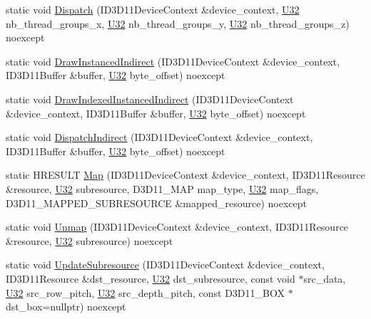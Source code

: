 \begin{DoxyCompactItemize}
\item 
static void \mbox{\hyperlink{structmage_1_1rendering_1_1_pipeline_a96bbf2861a3d4c10ba87c6b6f5228595}{Dispatch}} (I\+D3\+D11\+Device\+Context \&device\+\_\+context, \mbox{\hyperlink{namespacemage_aa5d6eaabaac3cdd01873d6a3d27e90f3}{U32}} nb\+\_\+thread\+\_\+groups\+\_\+x, \mbox{\hyperlink{namespacemage_aa5d6eaabaac3cdd01873d6a3d27e90f3}{U32}} nb\+\_\+thread\+\_\+groups\+\_\+y, \mbox{\hyperlink{namespacemage_aa5d6eaabaac3cdd01873d6a3d27e90f3}{U32}} nb\+\_\+thread\+\_\+groups\+\_\+z) noexcept
\item 
static void \mbox{\hyperlink{structmage_1_1rendering_1_1_pipeline_acfdf1d2aba1e8c0db9c4ef9e9730f31c}{Draw\+Instanced\+Indirect}} (I\+D3\+D11\+Device\+Context \&device\+\_\+context, I\+D3\+D11\+Buffer \&buffer, \mbox{\hyperlink{namespacemage_aa5d6eaabaac3cdd01873d6a3d27e90f3}{U32}} byte\+\_\+offset) noexcept
\item 
static void \mbox{\hyperlink{structmage_1_1rendering_1_1_pipeline_a51e2744827cbcf7791fcb40c0131d11b}{Draw\+Indexed\+Instanced\+Indirect}} (I\+D3\+D11\+Device\+Context \&device\+\_\+context, I\+D3\+D11\+Buffer \&buffer, \mbox{\hyperlink{namespacemage_aa5d6eaabaac3cdd01873d6a3d27e90f3}{U32}} byte\+\_\+offset) noexcept
\item 
static void \mbox{\hyperlink{structmage_1_1rendering_1_1_pipeline_aceae5a9f2d24336e4424208a8e037a82}{Dispatch\+Indirect}} (I\+D3\+D11\+Device\+Context \&device\+\_\+context, I\+D3\+D11\+Buffer \&buffer, \mbox{\hyperlink{namespacemage_aa5d6eaabaac3cdd01873d6a3d27e90f3}{U32}} byte\+\_\+offset) noexcept
\item 
static H\+R\+E\+S\+U\+LT \mbox{\hyperlink{structmage_1_1rendering_1_1_pipeline_ab0176557cd5473bf5cd77836ca2d924f}{Map}} (I\+D3\+D11\+Device\+Context \&device\+\_\+context, I\+D3\+D11\+Resource \&resource, \mbox{\hyperlink{namespacemage_aa5d6eaabaac3cdd01873d6a3d27e90f3}{U32}} subresource, D3\+D11\+\_\+\+M\+AP map\+\_\+type, \mbox{\hyperlink{namespacemage_aa5d6eaabaac3cdd01873d6a3d27e90f3}{U32}} map\+\_\+flags, D3\+D11\+\_\+\+M\+A\+P\+P\+E\+D\+\_\+\+S\+U\+B\+R\+E\+S\+O\+U\+R\+CE \&mapped\+\_\+resource) noexcept
\item 
static void \mbox{\hyperlink{structmage_1_1rendering_1_1_pipeline_ac4ad95111168cc62686da885da9ab161}{Unmap}} (I\+D3\+D11\+Device\+Context \&device\+\_\+context, I\+D3\+D11\+Resource \&resource, \mbox{\hyperlink{namespacemage_aa5d6eaabaac3cdd01873d6a3d27e90f3}{U32}} subresource) noexcept
\item 
static void \mbox{\hyperlink{structmage_1_1rendering_1_1_pipeline_ae1de65a4f77e4db1fe0582ab85ef1335}{Update\+Subresource}} (I\+D3\+D11\+Device\+Context \&device\+\_\+context, I\+D3\+D11\+Resource \&dst\+\_\+resource, \mbox{\hyperlink{namespacemage_aa5d6eaabaac3cdd01873d6a3d27e90f3}{U32}} dst\+\_\+subresource, const void $\ast$src\+\_\+data, \mbox{\hyperlink{namespacemage_aa5d6eaabaac3cdd01873d6a3d27e90f3}{U32}} src\+\_\+row\+\_\+pitch, \mbox{\hyperlink{namespacemage_aa5d6eaabaac3cdd01873d6a3d27e90f3}{U32}} src\+\_\+depth\+\_\+pitch, const D3\+D11\+\_\+\+B\+OX $\ast$dst\+\_\+box=nullptr) noexcept

\end{DoxyCompactItemize}
